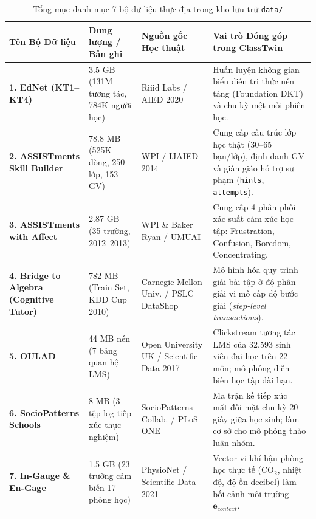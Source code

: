 \begin{table}[htbp]
  \centering\small
  \caption{Tổng mục danh mục 7 bộ dữ liệu thực địa trong kho lưu trữ \texttt{data/}}\label{tab:data-catalog-summary}
  \begin{tabularx}{\textwidth}{p{3.2cm} p{2.2cm} p{3.2cm} X}
    \toprule
    \textbf{Tên Bộ Dữ liệu} & \textbf{Dung lượng / Bản ghi} & \textbf{Nguồn gốc Học thuật} & \textbf{Vai trò Đóng góp trong ClassTwin} \\
    \midrule
    \textbf{1. EdNet (KT1--KT4)} & 3.5 GB (131M tương tác, 784K người học) & Riiid Labs / AIED 2020 & Huấn luyện không gian biểu diễn tri thức nền tảng (Foundation DKT) và chu kỳ mệt mỏi phiên học. \\
    \addlinespace
    \textbf{2. ASSISTments Skill Builder} & 78.8 MB (525K dòng, 250 lớp, 153 GV) & WPI / IJAIED 2014 & Cung cấp cấu trúc lớp học thật (30--65 bạn/lớp), định danh GV và giàn giáo hỗ trợ sư phạm (\texttt{hints}, \texttt{attempts}). \\
    \addlinespace
    \textbf{3. ASSISTments with Affect} & 2.87 GB (35 trường, 2012--2013) & WPI \& Baker Ryan / UMUAI & Cung cấp 4 phân phối xác suất cảm xúc học tập: Frustration, Confusion, Boredom, Concentrating. \\
    \addlinespace
    \textbf{4. Bridge to Algebra (Cognitive Tutor)} & 782 MB (Train Set, KDD Cup 2010) & Carnegie Mellon Univ. / PSLC DataShop & Mô hình hóa quy trình giải bài tập ở độ phân giải vi mô cấp độ bước giải (\textit{step-level transactions}). \\
    \addlinespace
    \textbf{5. OULAD} & 44 MB nén (7 bảng quan hệ LMS) & Open University UK / Scientific Data 2017 & Clickstream tương tác LMS của 32.593 sinh viên đại học trên 22 môn; mô phỏng diễn biến học tập dài hạn. \\
    \addlinespace
    \textbf{6. SocioPatterns Schools} & 8 MB (3 tệp log tiếp xúc thực nghiệm) & SocioPatterns Collab. / PLoS ONE & Ma trận kề tiếp xúc mặt-đối-mặt chu kỳ 20 giây giữa học sinh; làm cơ sở cho mô phỏng thảo luận nhóm. \\
    \addlinespace
    \textbf{7. In-Gauge \& En-Gage} & 1.5 GB (23 trường cảm biến 17 phòng học) & PhysioNet / Scientific Data 2021 & Vector vi khí hậu phòng học thực tế ($\text{CO}_2$, nhiệt độ, độ ồn decibel) làm bối cảnh môi trường $\mathbf{e}_{context}$. \\
    \bottomrule
  \end{tabularx}
\end{table}

